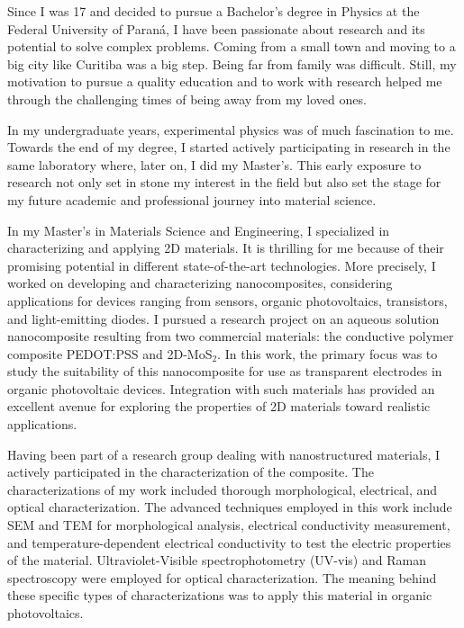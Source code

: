 \documentclass[12pt]{article}
\begin{document}
Since I was 17 and decided to pursue a Bachelor's degree in Physics at the Federal University of Paraná, I have been passionate about research and its potential to solve complex problems. Coming from a small town and moving to a big city like Curitiba was a big step. Being far from family was difficult. Still, my motivation to pursue a quality education and to work with research helped me through the challenging times of being away from my loved ones.

In my undergraduate years, experimental physics was of much fascination to me. Towards the end of my degree, I started actively participating in research in the same laboratory where, later on, I did my Master's. This early exposure to research not only set in stone my interest in the field but also set the stage for my future academic and professional journey into material science.

In my Master's in Materials Science and Engineering, I specialized in characterizing and applying 2D materials. It is thrilling for me because of their promising potential in different state-of-the-art technologies. More precisely, I worked on developing and characterizing nanocomposites, considering applications for devices ranging from sensors, organic photovoltaics, transistors, and light-emitting diodes. I pursued a research project on an aqueous solution nanocomposite resulting from two commercial materials: the conductive polymer composite PEDOT:PSS and 2D-MoS$_2$. In this work, the primary focus was to study the suitability of this nanocomposite for use as transparent electrodes in organic photovoltaic devices. Integration with such materials has provided an excellent avenue for exploring the properties of 2D materials toward realistic applications.

Having been part of a research group dealing with nanostructured materials, I actively participated in the characterization of the composite. The characterizations of my work included thorough morphological, electrical, and optical characterization. The advanced techniques employed in this work include SEM and TEM for morphological analysis, electrical conductivity measurement, and temperature-dependent electrical conductivity to test the electric properties of the material. Ultraviolet-Visible spectrophotometry (UV-vis) and Raman spectroscopy were employed for optical characterization. The meaning behind these specific types of characterizations was to apply this material in organic photovoltaics.
\end{document}
